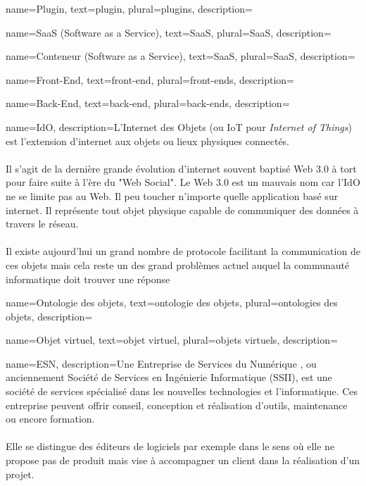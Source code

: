 \makeglossaries

{
    name=Plugin,
    text=plugin,
    plural=plugins,
    description={}
}

{
    name=SaaS (Software as a Service),
    text=SaaS,
    plural=SaaS,
    description={}
}

{
    name=Conteneur (Software as a Service),
    text=SaaS,
    plural=SaaS,
    description={}
}

{
    name=Front-End,
    text=front-end,
    plural=front-ends,
    description={}
}

{
    name=Back-End,
    text=back-end,
    plural=back-ends,
    description={}
}

{
    name=IdO,
    description={L'Internet des Objets (ou IoT pour \textit{Internet of Things}) est l'extension d'internet aux objets ou lieux physiques connectés.\\\\
    Il s'agit de la dernière grande évolution d'internet souvent baptisé Web 3.0 à tort pour faire suite à l'ère du "Web Social". Le Web 3.0 est un mauvais nom car l'IdO ne se limite pas au Web. Il peu toucher n'importe quelle application basé sur internet. Il représente tout objet physique capable de communiquer des données à travers le réseau. \\\\
    Il existe aujourd'hui un grand nombre de protocole facilitant la communication de ces objets mais cela reste un des grand problèmes actuel auquel la communauté informatique doit trouver une réponse}
}

{
    name=Ontologie des objets,
    text=ontologie des objets,
    plural=ontologies des objets,
    description={}
}

{
    name=Objet virtuel,
    text=objet virtuel,
    plural=objets virtuels,
    description={}
}

{
	name=ESN,
    description={Une Entreprise de Services du Numérique , ou anciennement Société de Services en Ingénierie Informatique (SSII), est une société de services spécialisé dans les nouvelles technologies et l’informatique. Ces entreprise peuvent offrir conseil, conception et réalisation d’outils, maintenance ou encore formation.\\\\
    Elle se distingue des éditeurs de logiciels par exemple dans le sens où elle ne propose pas de produit mais vise à accompagner un client dans la réalisation d'un projet.}
}


